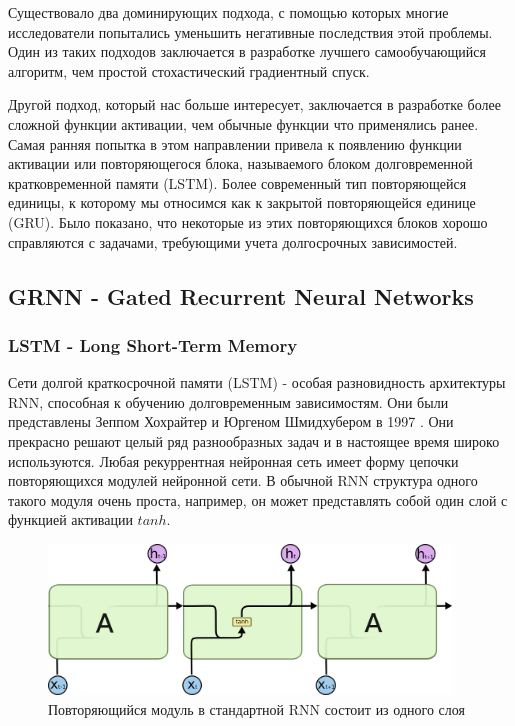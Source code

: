 	Существовало два доминирующих подхода, с помощью которых многие исследователи попытались уменьшить негативные последствия этой проблемы. Один из таких подходов заключается в разработке лучшего самообучающийся алгоритм, чем простой стохастический градиентный спуск.
	
	Другой подход, который нас больше интересует, заключается в разработке более сложной функции активации, чем обычные функции что применялись ранее. Самая ранняя попытка в этом направлении привела к появлению функции активации или повторяющегося блока, называемого блоком долговременной кратковременной памяти (LSTM)\cite{2}. Более современный тип повторяющейся единицы, к которому мы относимся как к закрытой повторяющейся единице (GRU)\cite{3}. Было показано, что некоторые из этих повторяющихся блоков хорошо справляются с задачами, требующими учета долгосрочных зависимостей.
	
	\subsection{GRNN - Gated Recurrent Neural Networks}
	\subsubsection{LSTM - Long Short-Term Memory}
	
	Сети долгой краткосрочной памяти (LSTM) - особая разновидность архитектуры RNN, способная к обучению долговременным зависимостям. Они были представлены Зеппом Хохрайтер и Юргеном Шмидхубером в 1997 \cite{2}. Они прекрасно решают целый ряд разнообразных задач и в настоящее время широко используются. Любая рекуррентная нейронная сеть имеет форму цепочки повторяющихся модулей нейронной сети. В обычной RNN структура одного такого модуля очень проста, например, он может представлять собой один слой с функцией активации $tanh$. 
	
	\begin{figure}[ht!]
		\centering
		\captionsetup{justification=centering}
		\includegraphics[height=40mm]{img/RNN Chain.png}
		\caption{Повторяющийся модуль в стандартной RNN состоит из одного слоя}
	\end{figure}
	
